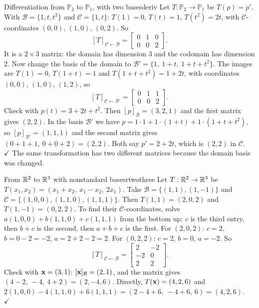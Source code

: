 \documentclass[11pt]{article}
\begin{document}
\begin{exmp}{Differentiation from $\mathbb{P}_2$ to $\mathbb{P}_1$, with two bases}{deriv}
Let $T:\mathbb{P}_2\to\mathbb{P}_1$ be $T(p)=p'$. With $\mathcal{B}=\{1,t,t^2\}$ and $\mathcal{C}=\{1,t\}$: $T(1)=0$, $T(t)=1$, $T(t^2)=2t$, with $\mathcal{C}$-coordinates $(0,0)$, $(1,0)$, $(0,2)$. So
\[
[T]_{\mathcal{C}\leftarrow\mathcal{B}}=\begin{bmatrix}0&1&0\\0&0&2\end{bmatrix}.
\]
It is a $2\times3$ matrix: the domain has dimension $3$ and the codomain has dimension $2$. Now change the basis of the domain to $\mathcal{B}'=\{1,\ 1+t,\ 1+t+t^2\}$. The images are $T(1)=0$, $T(1+t)=1$ and $T(1+t+t^2)=1+2t$, with coordinates $(0,0)$, $(1,0)$, $(1,2)$, so
\[
[T]_{\mathcal{C}\leftarrow\mathcal{B}'}=\begin{bmatrix}0&1&1\\0&0&2\end{bmatrix}.
\]
Check with $p(t)=3+2t+t^2$. Then $[p]_{\mathcal{B}}=(3,2,1)$ and the first matrix gives $(2,2)$. In the basis $\mathcal{B}'$ we have $p=1\cdot1+1\cdot(1+t)+1\cdot(1+t+t^2)$, so $[p]_{\mathcal{B}'}=(1,1,1)$ and the second matrix gives $(0+1+1,\ 0+0+2)=(2,2)$. Both say $p'=2+2t$, which is $(2,2)$ in $\mathcal{C}$. \ $\checkmark$ The same transformation has two different matrices because the domain basis was changed.
\end{exmp}

\begin{exmp}{From $\mathbb{R}^2$ to $\mathbb{R}^3$ with nonstandard bases}{rtwothree}
Let $T:\mathbb{R}^2\to\mathbb{R}^3$ be $T(x_1,x_2)=(x_1+x_2,\ x_1-x_2,\ 2x_1)$. Take $\mathcal{B}=\{(1,1),(1,-1)\}$ and $\mathcal{C}=\{(1,0,0),(1,1,0),(1,1,1)\}$. Then $T(1,1)=(2,0,2)$ and $T(1,-1)=(0,2,2)$. To find their $\mathcal{C}$-coordinates, solve $a(1,0,0)+b(1,1,0)+c(1,1,1)$ from the bottom up: $c$ is the third entry, then $b+c$ is the second, then $a+b+c$ is the first. For $(2,0,2)$: $c=2$, $b=0-2=-2$, $a=2+2-2=2$. For $(0,2,2)$: $c=2$, $b=0$, $a=-2$. So
\[
[T]_{\mathcal{C}\leftarrow\mathcal{B}}=\begin{bmatrix}2&-2\\-2&0\\2&2\end{bmatrix}.
\]
Check with $\mathbf{x}=(3,1)$: $[\mathbf{x}]_{\mathcal{B}}=(2,1)$, and the matrix gives $(4-2,\ -4,\ 4+2)=(2,-4,6)$. Directly, $T(\mathbf{x})=(4,2,6)$ and $2(1,0,0)-4(1,1,0)+6(1,1,1)=(2-4+6,\ -4+6,\ 6)=(4,2,6)$. \ $\checkmark$
\end{exmp}
\end{document}
